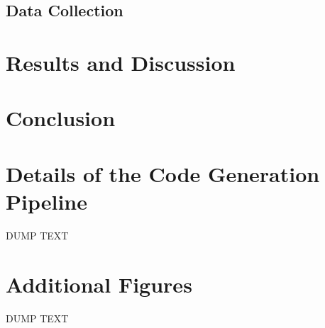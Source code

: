 \documentclass[conference]{IEEEtran}
\begin{document}
\subsection{Data Collection}

\section{Results and Discussion}
\section{Conclusion}

\appendices
\section{Details of the Code Generation Pipeline}
DUMP TEXT

\section{Additional Figures}
DUMP TEXT



\vspace{12pt}
\end{document}
